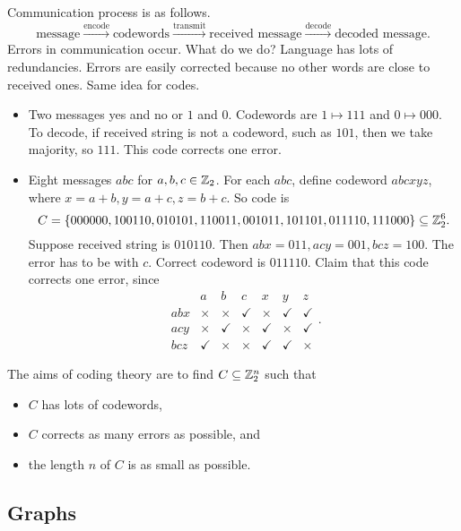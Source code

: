 Communication process is as follows.
$$ \text{message} \xrightarrow{\text{encode}} \text{codewords} \xrightarrow{\text{transmit}} \text{received message} \xrightarrow{\text{decode}} \text{decoded message}. $$
Errors in communication occur. What do we do? Language has lots of redundancies. Errors are easily corrected because no other words are close to received ones. Same idea for codes.

\begin{example*}
\hfill
\begin{itemize}
\item Two messages yes and no or $ 1 $ and $ 0 $. Codewords are $ 1 \mapsto 111 $ and $ 0 \mapsto 000 $. To decode, if received string is not a codeword, such as $ 101 $, then we take majority, so $ 111 $. This code corrects one error.
\item Eight messages $ abc $ for $ a, b, c \in \mathbb{Z}_2 $. For each $ abc $, define codeword $ abcxyz $, where $ x = a + b, y = a + c, z = b + c $. So code is
$$ C = \cbr{000000, 100110, 010101, 110011, 001011, 101101, 011110, 111000} \subseteq \Z_2^6. $$
Suppose received string is $ 010110 $. Then $ abx = 011, acy = 001, bcz = 100 $. The error has to be with $ c $. Correct codeword is $ 011110 $. Claim that this code corrects one error, since
$$
\begin{array}{c|cccccc}
& a & b & c & x & y & z \\
\hline
abx & \times & \times & \checkmark & \times & \checkmark & \checkmark \\
acy & \times & \checkmark & \times & \checkmark & \times & \checkmark \\
bcz & \checkmark & \times & \times & \checkmark & \checkmark & \times
\end{array}.
$$
\end{itemize}
\end{example*}

The aims of coding theory are to find $ C \subseteq \mathbb{Z}_2^n $ such that
\begin{itemize}
\item $ C $ has lots of codewords,
\item $ C $ corrects as many errors as possible, and
\item the length $ n $ of $ C $ is as small as possible.
\end{itemize}

\pagebreak

\subsection{Graphs}

